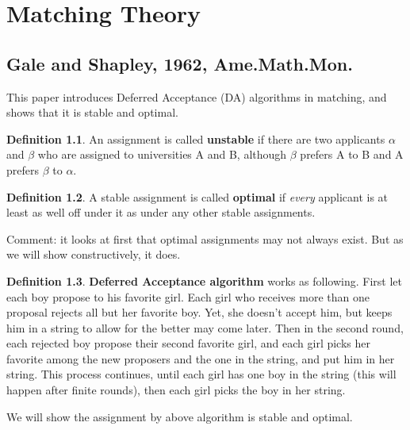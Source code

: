 \documentclass{book}
\theoremstyle{plain}
\theoremstyle{definition}
\newtheorem{defn}{Definition}[section] %
\begin{document}
\chapter{Matching Theory} %
\label{cha:matching_theory}

\section{Gale and Shapley, 1962, Ame.Math.Mon.} %
\label{sec:gale_and_shapley_1962}

\textbf{}

This paper introduces Deferred Acceptance (DA) algorithms in matching, and shows that it is stable and optimal.

\begin{defn}
An assignment is called \textbf{unstable} if there are two applicants $\alpha$ and $\beta$ who are assigned to universities A and B, although $\beta$ prefers A to B and A prefers $\beta$ to $\alpha$.
\end{defn}

\begin{defn}
A stable assignment is called \textbf{optimal} if \textit{every} applicant is at least as well off under it as under any other stable assignments.
\end{defn}

Comment: it looks at first that optimal assignments may not always exist. But as we will show constructively, it does.

\begin{defn}
\textbf{Deferred Acceptance algorithm} works as following. First let each boy propose to his favorite girl. Each girl who receives more than one proposal rejects all but her favorite boy. Yet, she doesn't accept him, but keeps him in a string to allow for the better may come later. Then in the second round, each rejected boy propose their second favorite girl, and each girl picks her favorite among the new proposers and the one in the string, and put him in her string. This process continues, until each girl has one boy in the string (this will happen after finite rounds), then each girl picks the boy in her string.
\end{defn}

We will show the assignment by above algorithm is stable and optimal.



\end{document}
